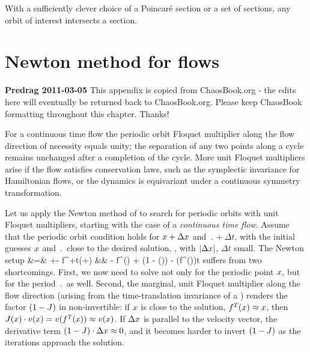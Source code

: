 With a sufficiently clever choice of a Poincar\'e section
or a set of sections,
any orbit of interest intersects a section.

\section{Newton method for flows}
\label{s-POs-flows}


{\bf Predrag 2011-03-05}
{This appendix is copied from ChaosBook.org - the edits here will
eventually be returned back to ChaosBook.org. Please keep ChaosBook
formatting throughout this chapter. Thanks!}

\noindent
For a continuous time flow the periodic orbit Floquet
multiplier
along the flow direction of
necessity equals unity; the separation of any two points along
a cycle remains unchanged after a completion of the cycle.
More unit Floquet multipliers arise if the
flow satisfies conservation laws, such as the symplectic
invariance for Hamiltonian flows, or the dynamics is equivariant
under a continuous symmetry transformation.

Let us apply the Newton method of
to search for
periodic orbits with unit Floquet multipliers,
starting with the case of a \emph{continuous time
flow}. Assume that the periodic orbit condition
holds for $x+\Delta x$ and
$\period{}+\Delta t$, with the initial guesses $x$ and
$\period{}$ close to the desired solution, \ie, with
$|\Delta x|$, $\Delta t$ small. The Newton setup
 &=& \ssp+\Delta\ssp - f^{\period{}+\Delta t}(\ssp+\Delta\ssp)
  \continue
  &\approx&
\ssp - f^{\period{}}(\ssp) + (1 - \jMps(\ssp))\cdot\Delta\ssp
- \vel(f^{\period{}}(\ssp))\Delta t
\label{NewtonVarFlow}
\eea
suffers from two shortcomings. First, we now need to solve not
only for the periodic point $x$, but for the period
$\period{}$ as well. Second, the marginal, unit Floquet
multiplier
along the flow direction
(arising from the time-translation invariance of a \po) renders
the factor $(1-J)$ in
non-invertible: if $x$ is close to the solution,
$f^{T_{}}(x)\approx x$, then
$J(x)\cdot v(x)=
v(f^{T_{}}(x))\approx v(x)$. If $\Delta x$ is
parallel to the velocity vector, the derivative term
$(1-J)\cdot\Delta x\approx 0$, and it becomes harder to invert
$(1-J)$ as the iterations approach the solution.

